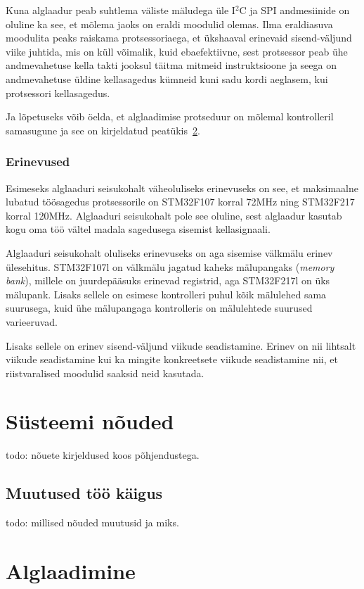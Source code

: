 \documentclass[12pt,a4paper]{article}
\newcommand{\iic}{I\({}^2\)C }
\begin{document}
Kuna alglaadur peab suhtlema väliste mäludega üle \iic ja SPI andmesiinide on
oluline ka see, et mõlema jaoks on eraldi moodulid olemas. Ilma eraldiasuva
moodulita peaks raiskama protsessoriaega, et ükshaaval erinevaid sisend-väljund
viike juhtida, mis on küll võimalik, kuid ebaefektiivne, sest protsessor peab
ühe andmevahetuse kella takti jooksul täitma mitmeid instruktsioone ja seega
on andmevahetuse üldine kellasagedus kümneid kuni sadu kordi aeglasem, kui
protsessori kellasagedus.

Ja lõpetuseks võib öelda, et alglaadimise protseduur on mõlemal kontrolleril
samasugune ja see on kirjeldatud peatükis~\ref{sec:boot}.

\subsubsection{Erinevused}
Esimeseks alglaaduri seisukohalt väheoluliseks erinevuseks on see, et
maksimaalne lubatud töösagedus protsessorile on STM32F107 korral 72MHz ning
STM32F217 korral 120MHz. Alglaaduri seisukohalt pole see oluline, sest alglaadur
kasutab kogu oma töö vältel madala sagedusega sisemist kellasignaali.

Alglaaduri seisukohalt oluliseks erinevuseks on aga sisemise välkmälu erinev
ülesehitus. STM32F107l on välkmälu jagatud kaheks mälupangaks (\textit{memory
bank}), millele on juurdepääsuks erinevad registrid, aga STM32F217l on üks
mälupank. Lisaks sellele on esimese kontrolleri puhul kõik mälulehed sama
suurusega, kuid ühe mälupangaga kontrolleris on mälulehtede suurused
varieeruvad. \cite{f1fpm,f2fpm}

Lisaks sellele on erinev sisend-väljund viikude seadistamine. Erinev on nii
lihtsalt viikude seadistamine kui ka mingite konkreetsete viikude seadistamine
nii, et riistvaralised moodulid saaksid neid kasutada.

\section{Süsteemi nõuded}
todo: nõuete kirjeldused koos põhjendustega.
\subsection{Muutused töö käigus}
todo: millised nõuded muutusid ja miks.

\section{Alglaadimine}
\label{sec:boot}
\end{document}
